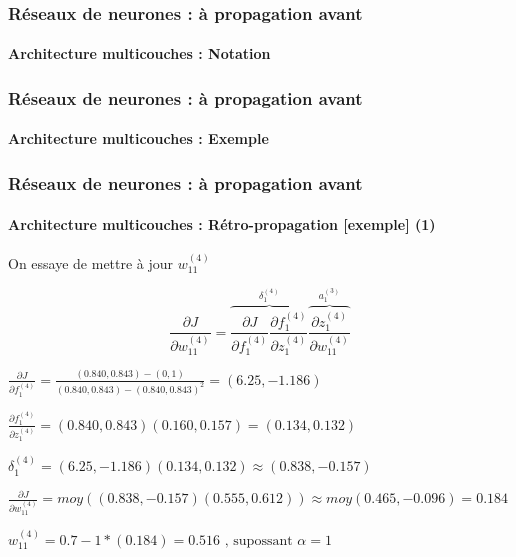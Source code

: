 \documentclass[xcolor=table]{beamer}
\begin{document}
\begin{frame}
\frametitle{Réseaux de neurones : à propagation avant}
\framesubtitle{Architecture multicouches : Notation}

\begin{center}
\end{center}

\end{frame}

\begin{frame}
\frametitle{Réseaux de neurones : à propagation avant}
\framesubtitle{Architecture multicouches : Exemple}


\end{frame}

\begin{frame}
\frametitle{Réseaux de neurones : à propagation avant}
\framesubtitle{Architecture multicouches : Rétro-propagation [exemple] (1)}

On essaye de mettre à jour $w_{11}^{(4)}$

\small

\[
\frac{\partial J}{\partial w_{11}^{(4)}} = \overbrace{\frac{\partial J}{\partial f_{1}^{(4)}} \frac{\partial f_{1}^{(4)}}{\partial z_{1}^{(4)}}}^{\delta_{1}^{(4)}} \overbrace{\frac{\partial z_{1}^{(4)}}{\partial w_{11}^{(4)}}}^{a_{1}^{(3)}}
\]
 
$ 
\frac{\partial J}{\partial f_{1}^{(4)}} = \frac{(0.840, 0.843) - (0, 1)}{(0.840, 0.843) - (0.840, 0.843)^2} 
= (6.25, -1.186)
$

$ 
\frac{\partial f_{1}^{(4)}}{\partial z_{1}^{(4)}} = (0.840, 0.843) (0.160, 0.157) = (0.134, 0.132)
$

$
\delta_{1}^{(4)} = (6.25, -1.186) (0.134, 0.132) \approx (0.838, -0.157)
$

$
\frac{\partial J}{\partial w_{11}^{(4)}} = moy((0.838, -0.157) (0.555, 0.612)) 
\approx moy(0.465, -0.096) = 0.184
$

$
w_{11}^{(4)} = 0.7 - 1 * (0.184) = 0.516 \text{ , supossant } \alpha = 1
$

\end{frame}
\end{document}

